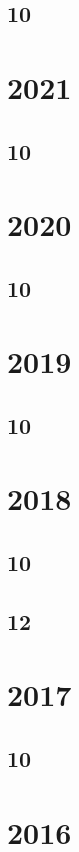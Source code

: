 \subsection{10}

\section{2021}
\subsection{10}

\section{2020}
\subsection{10}

\section{2019}
\subsection{10}

\section{2018}
\subsection{10}

\subsection{12}

\section{2017}
\subsection{10}




\section{2016}
